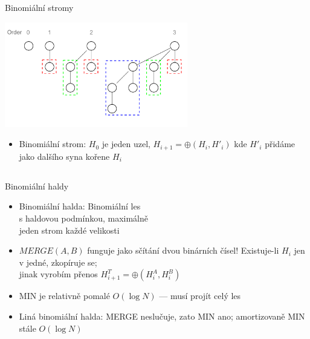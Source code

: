 \documentclass{beamer}
\begin{document}
\subsection{}
\begin{frame}{Binomiální stromy}
\begin{center}
\includegraphics[width=8cm]{Binomial_Trees.pdf}
\end{center}
\begin{itemize}
\item Binomiální strom: $H_0$ je jeden uzel, $H_{i+1} = \oplus(H_i, H'_i)$ kde $H'_i$ přidáme jako dalšího syna kořene $H_i$
\end{itemize}
\end{frame}

\subsection{}
\begin{frame}{Binomiální haldy}
\begin{itemize}
\item Binomiální halda: Binomiální les \\ s haldovou podmínkou, maximálně \\ jeden strom každé velikosti
\item $MERGE(A,B)$ funguje jako sčítání dvou binárních čísel! Existuje-li $H_i$ jen v jedné, zkopíruje se; \\ jinak vyrobím přenos $H^T_{i+1} =\oplus(H^A_i, H^B_i)$
\item MIN je relativně pomalé $O(\log N)$ --- musí projít celý les
\item Liná binomiální halda: MERGE neslučuje, zato MIN ano; amortizovaně MIN stále $O(\log N)$
\end{itemize}
\end{frame}
\end{document}
